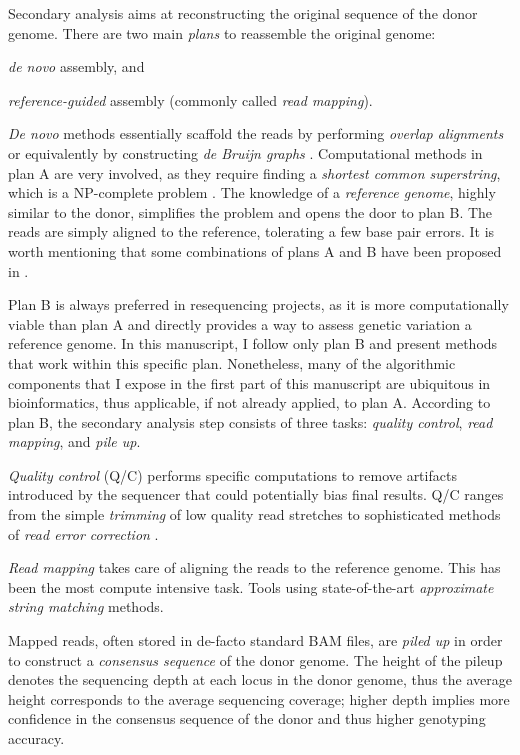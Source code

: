 Secondary analysis aims at reconstructing the original sequence of the donor genome.
There are two main \emph{plans} to reassemble the original genome: \begin{inparaenum}[(A)]
\item \emph{de novo} assembly, and
\item \emph{reference-guided} assembly (commonly called \emph{read mapping}).
\end{inparaenum}
\emph{De novo} methods essentially scaffold the reads by performing \emph{overlap alignments} \citep{?} or equivalently by constructing \emph{de Bruijn graphs} \citep{?}.
Computational methods in plan A are very involved, as they require finding a \emph{shortest common superstring}, which is a NP-complete problem \citep{?}.
The knowledge of a \emph{reference genome}, highly similar to the donor, simplifies the problem and opens the door to plan B.
The reads are simply aligned to the reference, tolerating a few base pair errors.
It is worth mentioning that some combinations of plans A and B have been proposed in \citep{fermi,?}.

Plan B is always preferred in resequencing projects, as it is more computationally viable than plan A and directly provides a way to assess genetic variation \wrt a reference genome.
In this manuscript, I follow only plan B and present methods that work within this specific plan.
Nonetheless, many of the algorithmic components that I expose in the first part of this manuscript are ubiquitous in bioinformatics, thus applicable, if not already applied, to plan A.
According to plan B, the secondary analysis step consists of three tasks: \emph{quality control}, \emph{read mapping}, and \emph{pile up}.

\emph{Quality control} (Q/C) performs specific computations to remove artifacts introduced by the sequencer that could potentially bias final results.
Q/C ranges from the simple \emph{trimming} of low quality read stretches to sophisticated methods of \emph{read error correction} \citep{fiona}.

\emph{Read mapping} takes care of aligning the reads to the reference genome.
This has been the most compute intensive task.
Tools using state-of-the-art \emph{approximate string matching} methods.

Mapped reads, often stored in de-facto standard BAM files, are \emph{piled up} in order to construct a \emph{consensus sequence} of the donor genome.
The height of the pileup denotes the sequencing depth at each locus in the donor genome, thus the average height corresponds to the average sequencing coverage;
higher depth implies more confidence in the consensus sequence of the donor and thus higher genotyping accuracy.

